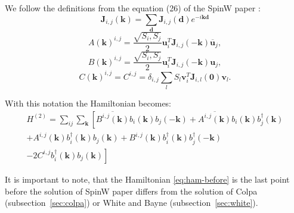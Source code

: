 \documentclass[a4paper,12pt]{article}
\begin{document}
        We follow the definitions from the equation (26) of the SpinW paper \cite{toth2015linear}:
        \begin{equation}
            \boldsymbol{J}_{i,j}(\boldsymbol{k}) = \sum_{\boldsymbol{d}}\boldsymbol{J}_{i,j}(\boldsymbol{d})e^{-i\boldsymbol{k}\boldsymbol{d}}
        \end{equation}
        \begin{equation}
            A(\boldsymbol{k})^{i,j} = \dfrac{\sqrt{S_i, S_j}}{2}\boldsymbol{u}^T_i\boldsymbol{J}_{i,j}(-\boldsymbol{k})\overline{\boldsymbol{u}}_j,
        \end{equation}
        \begin{equation}
            B(\boldsymbol{k})^{i,j} = \dfrac{\sqrt{S_i, S_j}}{2}\boldsymbol{u}^T_i\boldsymbol{J}_{i,j}(-\boldsymbol{k})\boldsymbol{u}_j,
        \end{equation}
        \begin{equation}
            C(\boldsymbol{k})^{i,j} = C^{i,j} = \delta_{i,j}\sum_{l}S_l \boldsymbol{v}^T_i\boldsymbol{J}_{i, l}(\boldsymbol{0})\boldsymbol{v}_l.
        \end{equation}

        With this notation the Hamiltonian becomes:
        \begin{multline}
            H^{(2)} = \sum_{ij}\sum_{\boldsymbol{k}}\left[\overline{B^{i,j}(\boldsymbol{k})}b_{i}(\boldsymbol{k})b_{j}(-\boldsymbol{k}) +
            \overline{A^{i,j}(\boldsymbol{k})}b_{i}(\boldsymbol{k})b^{\dag}_{j}(\boldsymbol{k})\right. \\+ 
            A^{i,j}(\boldsymbol{k})b^{\dag}_{i}(\boldsymbol{k})b_{j}(\boldsymbol{k}) +
            B^{i,j}(\boldsymbol{k})b^{\dag}_{i}(\boldsymbol{k})b^{\dag}_{j}(-\boldsymbol{k}) \\-
            \left.2 C^{i,j}b^{\dag}_{i}(\boldsymbol{k})b_{j}(\boldsymbol{k})\right] \label{eq:ham-before}
        \end{multline}

        It is important to note, that the Hamiltonian \eqref{eq:ham-before} is the last point before the solution of SpinW paper \cite{toth2015linear} 
        differs from the solution of Colpa (subsection~\ref{sec:colpa}) or White and Bayne (subsection~\ref{sec:white}).
\end{document}
